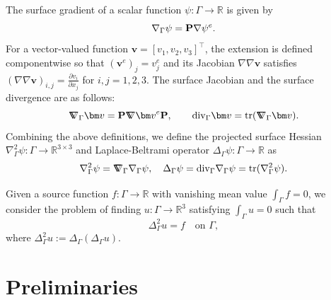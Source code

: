 \documentclass[10pt, a4paper]{amsart}
\newcommand{\bv}{{\bm v}}
\newcommand{\bbR}{\mathbb{R}}
\newcommand{\p}{\partial}
\newcommand{\nab}{\nabla}
\newcommand{\Grad}{\nabla\!\!\!\!\nabla}
\newcommand{\hesstwo}{\nab_\Gamma^2}
\theoremstyle{definition}
\theoremstyle{remark}
\theoremstyle{example}
\numberwithin{equation}{section}
\begin{document}
The surface gradient of a scalar function
$\psi:\Gamma\to \bbR$ is given by
%
\[
\nab_\Gamma\psi = {\bf P}\nab\psi^e.
\]
For a vector-valued function $\bv = [v_1, v_2, v_3]^\intercal$, 
the extension is defined componentwise so that $(\bv^e)_j = v_j^e$ and its
Jacobian $\Grad\bv$ satisfies $(\Grad\bv)_{i, j} = \frac{\p v_i}{\p x_j}$ for $i, j = 1, 2, 3$. The surface Jacobian and the surface divergence are as follows:
\[
\Grad_\Gamma\bv = {\bf P}\Grad\bv^e{\bf P}, \qquad {\rm div}_{\Gamma}\bv = {\rm tr}(\Grad_\Gamma \bv).
\]
Combining the above definitions, we define the projected surface Hessian $\hesstwo\psi: \Gamma \rightarrow \bbR^{3\times 3}$
and Laplace-Beltrami operator $\Delta_\Gamma \psi:\Gamma \to \bbR$ as
%
\[
\nabla_{\Gamma}^{2}\psi = \Grad_{\Gamma}\nabla_{\Gamma}\psi,\quad\Delta_\Gamma\psi = {\rm div}_{\Gamma}\nab_{\Gamma}\psi = {\rm tr}(\nab_\Gamma^2\psi).
\]

Given a source function $f:\Gamma\to \bbR$ 
with vanishing mean value $\int_\Gamma f = 0$, we consider
the problem of finding  $u: \Gamma \rightarrow \bbR^3$ satisfying $\int_\Gamma u = 0$ such that
\begin{equation} \label{eqn:SBiharmonicProblem}
\Delta_\Gamma^2u
= f \quad \text{on } \Gamma,
\end{equation}
where  $\Delta_\Gamma^2u := \Delta_\Gamma(\Delta_\Gamma u)$.




\section{Preliminaries}\label{sec-prelim}

\end{document}
